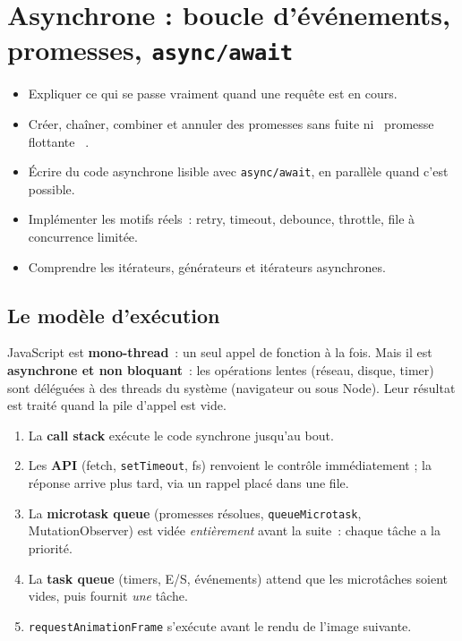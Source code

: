 \chapter{Asynchrone : boucle d'\'ev\'enements, promesses, \texttt{async/await}}
\label{ch-js-async}

\begin{objectif}
\begin{itemize}
  \item Expliquer ce qui se passe vraiment quand une requ\^ete est en cours.
  \item Cr\'eer, cha\^iner, combiner et annuler des promesses sans fuite ni \og ~promesse flottante~ \fg{}.
  \item \'Ecrire du code asynchrone lisible avec \verb|async/await|, en parall\`ele quand c'est possible.
  \item Impl\'ementer les motifs r\'eels~: retry, timeout, debounce, throttle, file \`a concurrence limit\'ee.
  \item Comprendre les it\'erateurs, g\'en\'erateurs et it\'erateurs asynchrones.
\end{itemize}
\end{objectif}

\section{Le mod\`ele d'ex\'ecution}

JavaScript est \textbf{mono-thread}~: un seul appel de fonction \`a la fois. Mais il est
\textbf{asynchrone et non bloquant}~: les op\'erations lentes (r\'eseau, disque, timer) sont d\'el\'egu\'ees
\`a des threads du syst\`eme (navigateur ou  sous Node).
Leur r\'esultat est trait\'e quand la pile d'appel est vide.

\begin{enumerate}
  \item La \textbf{call stack} ex\'ecute le code synchrone jusqu'au bout.
  \item Les \textbf{API} (fetch, \verb|setTimeout|, fs) renvoient le contr\^ole imm\'ediatement ;
        la r\'eponse arrive plus tard, via un rappel plac\'e dans une file.
  \item La \textbf{microtask queue} (promesses r\'esolues, \verb|queueMicrotask|, MutationObserver)
        est vid\'ee \emph{enti\`erement} avant la suite~: chaque t\^ache a la priorit\'e.
  \item La \textbf{task queue} (timers, E/S, \'ev\'enements) attend que les microt\^aches soient vides,
        puis fournit \emph{une} t\^ache.
  \item \verb|requestAnimationFrame| s'ex\'ecute avant le rendu de l'image suivante.
\end{enumerate}

